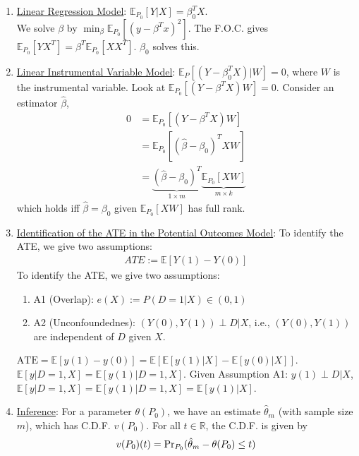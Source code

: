\documentclass[11pt]{elegantbook}
\begin{document}
\begin{example}
    \begin{enumerate}
        \item \underline{Linear Regression Model}: $\mathbb{E}_{P_0}[Y|X]=\beta^T_0 X$.\\
        We solve $\beta$ by $\min_\beta \mathbb{E}_{P_0}[(y-\beta^Tx)^2]$. The F.O.C. gives $\mathbb{E}_{P_0}[YX^T]=\beta^T \mathbb{E}_{P_0}[XX^T]$. $\beta_0$ solves this.
        \item \underline{Linear Instrumental Variable Model}: $\mathbb{E}_P[(Y-\beta^T_0X)|W]=0$, where $W$ is the instrumental variable. Look at $\mathbb{E}_{P_0}[(Y-\beta^TX)W]=0$. Consider an estimator $\hat{\beta}$,
        \begin{equation}
            \begin{aligned}
                0&=\mathbb{E}_{P_0}[(Y-\beta^TX)W]\\
                &=\mathbb{E}_{P_0}[(\hat{\beta}-\beta_0)^TXW]\\
                &=\underbrace{(\hat{\beta}-\beta_0)^T}_{1\times m}\underbrace{\mathbb{E}_{P_0}[XW]}_{m\times k}
            \end{aligned}
            \nonumber
        \end{equation}
        which holds iff $\hat{\beta}=\beta_0$ given $\mathbb{E}_{P_0}[XW]$ has full rank.
        \item \underline{Identification of the ATE in the Potential Outcomes Model}: To identify the ATE, we give two assumptions:
        \begin{equation}
            \begin{aligned}
                ATE:=\mathbb{E}[Y(1)-Y(0)]
            \end{aligned}
            \nonumber
        \end{equation}
        To identify the ATE, we give two assumptions:
        \begin{enumerate}
            \item A1 (Overlap): $e(X):=P(D=1|X)\in(0,1)$
            \item A2 (Unconfoundednes): $(Y(0),Y(1))\perp D|X$, i.e., $(Y(0),Y(1))$ are independent of $D$ given $X$.
        \end{enumerate}
        $\text{ATE}=\mathbb{E}[y(1)-y(0)]=\mathbb{E}[\mathbb{E}[y(1)|X]-\mathbb{E}[y(0)|X]]$. $\mathbb{E}[y|D=1,X]=\mathbb{E}[y(1)|D=1,X]$. Given Assumption A1: $y(1)\perp D|X$, $\mathbb{E}[y|D=1,X]=\mathbb{E}[y(1)|D=1,X]=\mathbb{E}[y(1)|X]$.
        \item \underline{Inference}: For a parameter $\theta(P_0)$, we have an estimate $\hat{\theta}_m$ (with sample size $m$), which has C.D.F. $v(P_0)$. For all $t\in \mathbb{R}$, the C.D.F. is given by
        \begin{equation}
            \begin{aligned}
                v(P_0)(t)=\textnormal{Pr}_{P_0}(\hat{\theta}_m-\theta(P_0)\leq t)
            \end{aligned}
            \nonumber
        \end{equation}
    \end{enumerate}
\end{example}
\end{document}
